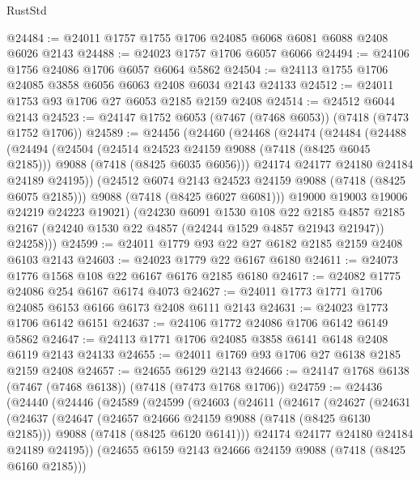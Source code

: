 \begin{lexlean}{RustStd}
\begin{coremodule}
@24484 := @24011 @1757 @1755 @1706 @24085 @6068 @6081 @6088 @2408 @6026 @2143
@24488 := @24023 @1757 @1706 @6057 @6066
@24494 := @24106 @1756 @24086 @1706 @6057 @6064 @5862
@24504 := @24113 @1755 @1706 @24085 @3858 @6056 @6063 @2408 @6034 @2143 @24133
@24512 := @24011 @1753 @93 @1706 @27 @6053 @2185 @2159 @2408
@24514 := @24512 @6044 @2143
@24523 := @24147 @1752 @6053 (@7467 (@7468 @6053)) (@7418 (@7473 @1752 @1706))
@24589 := @24456
    (@24460
      (@24468
        (@24474
          (@24484
            (@24488
              (@24494
                (@24504
                  (@24514 @24523 @24159 @9088 (@7418 (@8425 @6045 @2185)))
                  @9088
                  (@7418 (@8425 @6035 @6056)))
                @24174
                @24177
                @24180
                @24184
                @24189
                @24195))
            (@24512 @6074 @2143 @24523 @24159 @9088 (@7418 (@8425 @6075 @2185)))
            @9088
            (@7418 (@8425 @6027 @6081)))
          @19000
          @19003
          @19006
          @24219
          @24223
          @19021)
        (@24230
          @6091
          @1530
          @108
          @22
          @2185
          @4857
          @2185
          @2167
          (@24240 @1530 @22 @4857 (@24244 @1529 @4857 @21943 @21947))
          @24258)))
@24599 := @24011 @1779 @93 @22 @27 @6182 @2185 @2159 @2408 @6103 @2143
@24603 := @24023 @1779 @22 @6167 @6180
@24611 := @24073 @1776 @1568 @108 @22 @6167 @6176 @2185 @6180
@24617 := @24082 @1775 @24086 @254 @6167 @6174 @4073
@24627 := @24011 @1773 @1771 @1706 @24085 @6153 @6166 @6173 @2408 @6111 @2143
@24631 := @24023 @1773 @1706 @6142 @6151
@24637 := @24106 @1772 @24086 @1706 @6142 @6149 @5862
@24647 := @24113 @1771 @1706 @24085 @3858 @6141 @6148 @2408 @6119 @2143 @24133
@24655 := @24011 @1769 @93 @1706 @27 @6138 @2185 @2159 @2408
@24657 := @24655 @6129 @2143
@24666 := @24147 @1768 @6138 (@7467 (@7468 @6138)) (@7418 (@7473 @1768 @1706))
@24759 := @24436
    (@24440
      (@24446
        (@24589
          (@24599
            (@24603
              (@24611
                (@24617
                  (@24627
                    (@24631
                      (@24637
                        (@24647
                          (@24657 @24666 @24159 @9088 (@7418 (@8425 @6130 @2185)))
                          @9088
                          (@7418 (@8425 @6120 @6141)))
                        @24174
                        @24177
                        @24180
                        @24184
                        @24189
                        @24195))
                    (@24655 @6159 @2143 @24666 @24159 @9088 (@7418 (@8425 @6160 @2185)))

\end{coremodule}
\end{lexlean}
